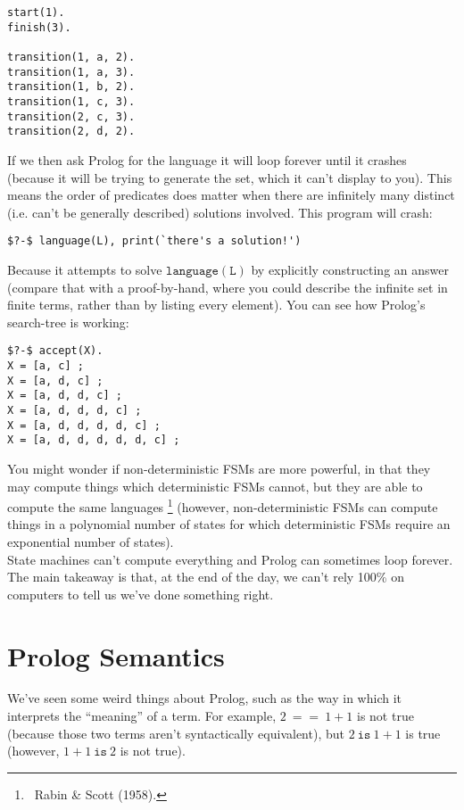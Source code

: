 \documentclass[a4paper,12pt]{article}
\newcommand{\kwa}[1]{\mathtt{#1}}
\begin{document}
\begin{lstlisting}
start(1).
finish(3).

transition(1, a, 2).
transition(1, a, 3).
transition(1, b, 2).
transition(1, c, 3).
transition(2, c, 3).
transition(2, d, 2).
\end{lstlisting}

\noindent
If we then ask Prolog for the language it will loop forever until it crashes (because it will be trying to generate the set, which it can't display to you). This means the order of predicates does matter when there are infinitely many distinct (i.e. can't be generally described) solutions involved. This program will crash:

\begin{lstlisting}
$?-$ language(L), print(`there's a solution!')
\end{lstlisting}

\noindent
Because it attempts to solve $\kwa{language(L)}$ by explicitly constructing an answer (compare that with a proof-by-hand, where you could describe the infinite set in finite terms, rather than by listing every element). You can see how Prolog's search-tree is working:

\begin{lstlisting}
$?-$ accept(X).
X = [a, c] ;
X = [a, d, c] ;
X = [a, d, d, c] ;
X = [a, d, d, d, c] ;
X = [a, d, d, d, d, c] ;
X = [a, d, d, d, d, d, c] ;
\end{lstlisting}

\noindent
You might wonder if non-deterministic FSMs are more powerful, in that they may compute things which deterministic FSMs cannot, but they are able to compute the same languages \footnote{~Rabin \& Scott (1958).} (however, non-deterministic FSMs can compute things in a polynomial number of states for which deterministic FSMs require an exponential number of states). \\

\noindent
State machines can't compute everything and Prolog can sometimes loop forever. The main takeaway is that, at the end of the day, we can't rely 100\% on computers to tell us we've done something right.


\section{Prolog Semantics}

We've seen some weird things about Prolog, such as the way in which it interprets the ``meaning'' of a term. For example, $2 ~\kwa{==}~ 1+1$ is not true (because those two terms aren't syntactically equivalent), but $2~ \kwa{is} ~1+1$ is true (however, $1+1~ \kwa{is} ~2$ is not true). \\
\end{document}
